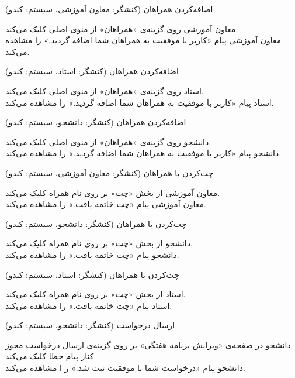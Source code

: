 \documentclass{report}
\begin{document}
\textbf{}
اضافه‌کردن همراهان (کنشگر: معاون آموزشی، سیستم: کندو)\begin{addmargin}[.84cm]{0cm}
معاون آموزشی روی گزینه‌ی «همراهان» از منوی اصلی کلیک می‌کند.\\
معاون آموزشی پیام «کاربر با موفقیت به همراهان شما اضافه گردید.» را مشاهده می‌کند.
\end{addmargin}

\textbf{}
اضافه‌کردن همراهان (کنشگر: استاد، سیستم: کندو)
\begin{addmargin}[.84cm]{0cm}
استاد روی گزینه‌ی «همراهان» از منوی اصلی کلیک می‌کند.\\
استاد پیام «کاربر با موفقیت به همراهان شما اضافه گردید.» را مشاهده می‌کند.
\end{addmargin}

\textbf{}
اضافه‌کردن همراهان (کنشگر: دانشجو، سیستم: کندو)
\begin{addmargin}[.84cm]{0cm}
دانشجو روی گزینه‌ی «همراهان» از منوی اصلی کلیک می‌کند.\\
دانشجو پیام «کاربر با موفقیت به همراهان شما اضافه گردید.» را مشاهده می‌کند.
\end{addmargin}

\textbf{}
چت‌کردن با همراهان (کنشگر: معاون آموزشی، سیستم: کندو)
\begin{addmargin}[.84cm]{0cm}
معاون آموزشی از بخش «چت» بر روی نام همراه کلیک می‌کند.\\
معاون آموزشی پیام «چت خاتمه یافت.» را مشاهده می‌کند.
\end{addmargin}

\textbf{}
چت‌کردن با همراهان (کنشگر: دانشجو، سیستم: کندو)\begin{addmargin}[.84cm]{0cm}
دانشجو از بخش «چت» بر روی نام همراه کلیک می‌کند.\\
دانشجو پیام «چت خاتمه یافت.» را مشاهده می‌کند.
\end{addmargin}

\textbf{}
چت‌کردن با همراهان (کنشگر: استاد، سیستم: کندو)
\begin{addmargin}[.84cm]{0cm}
استاد از بخش «چت» بر روی نام همراه کلیک می‌کند.\\
استاد پیام «چت خاتمه یافت.» را مشاهده می‌کند.
\end{addmargin}

\textbf{}
ارسال درخواست (کنشگر: دانشجو، سیستم: کندو)
\begin{addmargin}[.84cm]{0cm}
دانشجو در صفحه‌ی «ویرایش برنامه هفتگی» بر روی گزینه‌ی ارسال درخواست مجوز کنار پیام خطا کلیک می‌کند.\\
دانشجو پیام «درخواست شما با موفقیت ثبت شد.» ر ا مشاهده می‌کند.
\end{addmargin}
\end{document}
